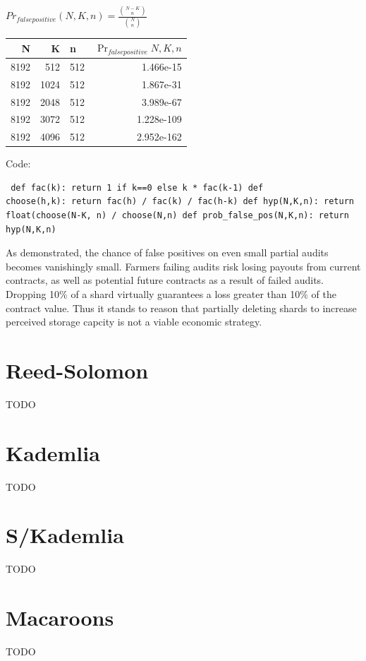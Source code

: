 \documentclass[a4paper,10pt]{article} \usepackage[utf8]{inputenc}
\newcommand{\todo}[1]{{\color{red} TODO #1 }}
\begin{document}
{\centering $Pr_{false positive}(N,K,n) = \displaystyle \frac{{N-K \choose n}}
{{N \choose n}}$ \\}

\begin{table}[hbt!] \begin{center} \begin{tabular}{r r l r} N & K & n &
$\Pr_{falsepositive}{N,K,n}$\\ \hline 8192 & 512  & 512 & 1.466e-15\\ \hline
8192 & 1024 & 512 & 1.867e-31\\ \hline 8192 & 2048 & 512 & 3.989e-67\\ \hline
8192 & 3072 & 512 & 1.228e-109\\ \hline 8192 & 4096 & 512 & 2.952e-162\\
\end{tabular} \end{center} \end{table}

Code: \begin{lstlisting} def fac(k): return 1 if k==0 else k * fac(k-1) def
choose(h,k): return fac(h) / fac(k) / fac(h-k) def hyp(N,K,n): return
float(choose(N-K, n) / choose(N,n) def prob_false_pos(N,K,n): return hyp(N,K,n)
\end{lstlisting}

As demonstrated, the chance of false positives on even small partial audits
becomes vanishingly small. Farmers failing audits risk losing payouts from
current contracts, as well as potential future contracts as a result of failed
audits. Dropping 10\% of a shard virtually guarantees a loss greater than 10\%
of the contract value. Thus it stands to reason that partially deleting shards
to increase perceived storage capcity is not a viable economic strategy.

\section{Reed-Solomon}

\todo{}

\section{Kademlia}

\todo{}

\section{S/Kademlia}

\todo{}

\section{Macaroons}

\todo{}

\newpage  \begingroup \raggedright
 \endgroup
\end{document}
